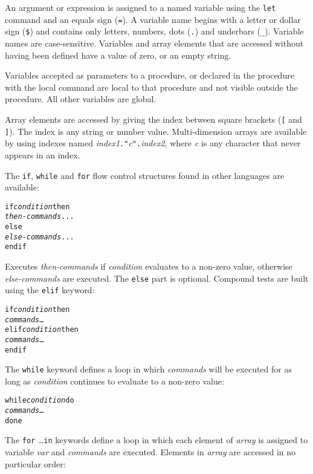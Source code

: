 An argument or expression is assigned to a named variable using the
\texttt{let} command and an equals sign (\texttt{=}).  A variable name begins
with a letter or dollar sign (\texttt{\$}) and contains only letters, numbers,
dots (\texttt{.}) and underbars (\texttt{\_}).  Variable names are
case-sensitive.  Variables and array elements that are accessed without having
been defined have a value of zero, or an empty string.

Variables accepted as parameters to a procedure, or declared in the procedure
with the local command are local to that procedure and not visible outside the
procedure.  All other variables are global.

Array elements are accessed by giving the index between
square brackets (\texttt{[} and \texttt{]}).
The index is any string or number value.
Multi-dimension arrays are available by using
indexes named \textit{index1}\texttt{."}\textit{c}\texttt{".}\textit{index2},
where \textit{c} is any character that never appears in an index.

The \texttt{if}, \texttt{while} and \texttt{for}
flow control structures
found in other languages are available:

\begin{alltt}
if \textit{condition} then
  \textit{then-commands} ...
else
  \textit{else-commands} ...
endif
\end{alltt}

Executes \textit{then-commands} if \textit{condition} evaluates to
a non-zero value, otherwise \textit{else-commands} are executed.
The \texttt{else} part is optional.
Compound tests are built using the \texttt{elif} keyword:

\begin{alltt}
if \textit{condition} then
  \textit{commands} \dots
elif \textit{condition} then
  \textit{commands} \dots
endif
\end{alltt}

The \texttt{while} keyword defines a loop in which
\textit{commands} will be executed for as long
as \textit{condition} continues to evaluate to a non-zero value:

\begin{alltt}
while \textit{condition} do
  \textit{commands} \dots
done
\end{alltt}

The \texttt{for} \dots \texttt{in} keywords define a loop in which
each element of \textit{array} is assigned to variable \textit{var}
and \textit{commands} are executed.
Elements in \textit{array} are accessed in no particular order:

